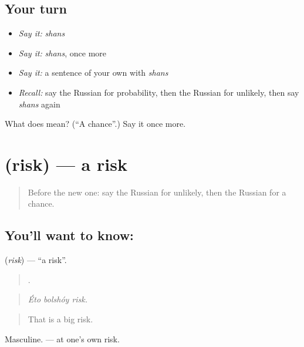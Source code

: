 \subsection*{Your turn}
\begin{itemize}
\raggedright
  \item \emph{Say it:} \emph{shans}
  \item \emph{Say it:} \emph{shans}, once more
  \item \emph{Say it:} a sentence of your own with \emph{shans}
  \item \emph{Recall:} say the Russian for probability, then the Russian for unlikely, then say \emph{shans} again
\end{itemize}

\begin{tcolorbox}[breakable,colback=teal!4,colframe=teal!35!black,title={Before you move on}]
What does  mean? (\textquotedblleft{}A chance\textquotedblright{}.) Say it once more.
\end{tcolorbox}
\section[\texorpdfstring{\ru{риск} (risk)}{риск (risk)}]{ (risk) — a risk}

\label{lesson:RU-C372-risk}



\begin{quote}
Before the new one: say the Russian for unlikely, then the Russian for a chance.
\end{quote}

\subsection*{You'll want to know: }
\textbf{} (\emph{risk}) — \textquotedblleft{}a risk\textquotedblright{}.

\begin{quote}
  .
\end{quote}

\begin{quote}
\emph{Éto bolshóy risk.}
\end{quote}

\begin{quote}
That is a big risk.
\end{quote}

Masculine. \emph{  } — at one’s own risk.

